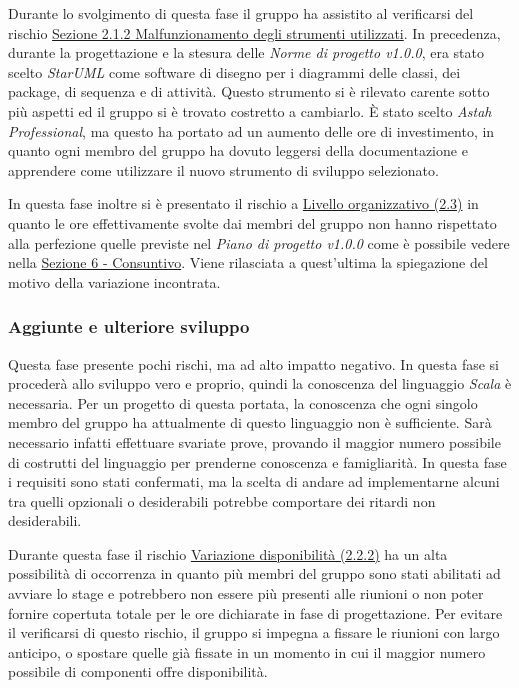 \documentclass[a4paper]{article}
\begin{document}
				Durante lo svolgimento di questa fase il gruppo ha assistito al verificarsi del rischio 
				\hyperref[MalfunzionamentoStrumenti]{Sezione 2.1.2 Malfunzionamento degli strumenti utilizzati}. 
				In precedenza, durante la progettazione e la stesura delle \emph{Norme di progetto v1.0.0}, era stato scelto \emph{StarUML} come 
				software di disegno per i diagrammi delle classi, dei package, di sequenza e di attività. Questo strumento si è rilevato  carente sotto 
				più aspetti ed il gruppo si è trovato costretto a cambiarlo.
				È stato scelto \emph{Astah Professional}, ma questo ha portato ad un aumento delle ore di investimento, in quanto ogni membro del gruppo 
				ha dovuto leggersi della documentazione e apprendere come utilizzare il nuovo strumento di sviluppo selezionato.
				
				In questa fase inoltre si è presentato il rischio a \hyperref[LivelloOrganizzativo]{Livello organizzativo (2.3)} in quanto le ore effettivamente 
				svolte dai membri del gruppo non hanno rispettato alla perfezione quelle previste nel \emph{Piano di progetto v1.0.0} come è possibile vedere 
				nella \hyperref[Consuntivo]{Sezione 6 - Consuntivo}. Viene rilasciata a quest'ultima la spiegazione del motivo della variazione incontrata.
				
			\subsubsection{Aggiunte e ulteriore sviluppo}
                Questa fase presente pochi rischi, ma ad alto impatto negativo. In questa fase si procederà allo sviluppo vero e proprio, quindi la conoscenza 
                del linguaggio \emph{Scala} è necessaria. Per un progetto di questa portata, la conoscenza che ogni singolo membro del gruppo ha attualmente di 
                questo linguaggio non è sufficiente. Sarà necessario infatti effettuare svariate prove, provando il maggior numero possibile di costrutti del 
                linguaggio per prenderne conoscenza e famigliarità. In questa fase i requisiti sono stati confermati, ma la scelta di andare ad implementarne 
                alcuni tra quelli opzionali o desiderabili potrebbe comportare dei ritardi non desiderabili.
				
				Durante questa fase il rischio \hyperref[VariazioneDisponibilita]{Variazione disponibilità (2.2.2)} ha un alta possibilità di occorrenza in quanto 
				più membri del gruppo sono stati abilitati ad avviare lo stage e potrebbero non essere più presenti alle riunioni o non poter fornire copertuta 
				totale per le ore dichiarate in fase di progettazione. Per evitare il verificarsi di questo rischio, il gruppo si impegna a fissare le riunioni 
				con largo anticipo, o spostare quelle già fissate in un momento in cui il maggior numero possibile di componenti offre disponibilità. 
                
\end{document}
